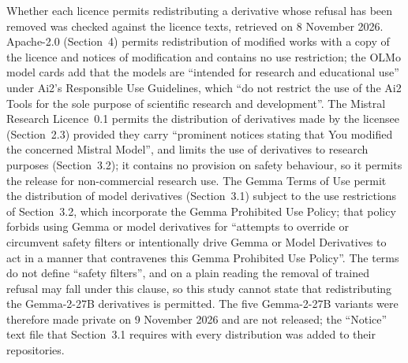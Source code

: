 Whether each licence permits redistributing a derivative whose refusal has
been removed was checked against the licence texts, retrieved on 8 November
2026. Apache-2.0 (Section~4) permits redistribution of modified works with a
copy of the licence and notices of modification and contains no use
restriction; the OLMo model cards add that the models are ``intended for
research and educational use'' under Ai2's Responsible Use Guidelines, which
``do not restrict the use of the Ai2 Tools for the sole purpose of scientific
research and development''. The Mistral Research Licence~0.1 permits the
distribution of derivatives made by the licensee (Section~2.3) provided they
carry ``prominent notices stating that You modified the concerned Mistral
Model'', and limits the use of derivatives to research purposes
(Section~3.2); it contains no provision on safety behaviour, so it permits
the release for non-commercial research use. The Gemma Terms of Use permit
the distribution of model derivatives (Section~3.1) subject to the use
restrictions of Section~3.2, which incorporate the Gemma Prohibited Use
Policy; that policy forbids using Gemma or model derivatives for ``attempts to
override or circumvent safety filters or intentionally drive Gemma or Model
Derivatives to act in a manner that contravenes this Gemma Prohibited Use
Policy''. The terms do not define ``safety filters'', and on a plain reading
the removal of trained refusal may fall under this clause, so this study
cannot state that redistributing the Gemma-2-27B derivatives is permitted.
The five Gemma-2-27B variants were therefore made private on 9 November 2026
and are not released; the ``Notice'' text file that Section~3.1 requires with
every distribution was added to their repositories.
